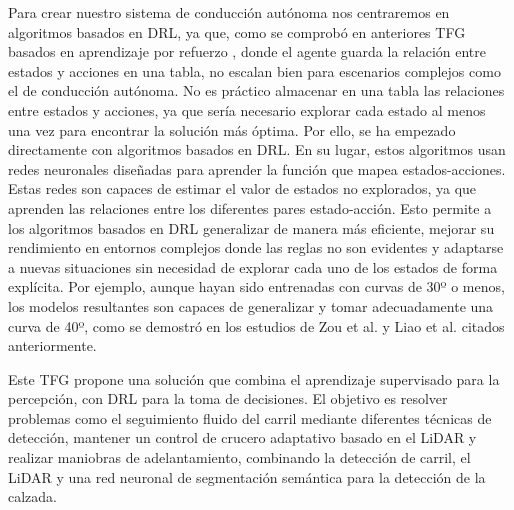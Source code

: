 Para crear nuestro sistema de conducción autónoma nos centraremos en algoritmos basados en \ac{DRL}, ya que, como se comprobó en anteriores \ac{TFG} basados en aprendizaje por refuerzo \cite{tfg-aws-carla}, donde el agente guarda la relación entre estados y acciones en una tabla, no escalan bien para escenarios complejos como el de conducción autónoma. No es práctico almacenar en una tabla las relaciones entre estados y acciones, ya que sería necesario explorar cada estado al menos una vez para encontrar la solución más óptima. Por ello, se ha empezado directamente con algoritmos basados en \ac{DRL}. En su lugar, estos algoritmos usan redes neuronales diseñadas para aprender la función que mapea estados-acciones. Estas redes son capaces de estimar el valor de estados no explorados, ya que aprenden las relaciones entre los diferentes pares estado-acción. Esto permite a los algoritmos basados en \ac{DRL} generalizar de manera más eficiente, mejorar su rendimiento en entornos complejos donde las reglas no son evidentes y adaptarse a nuevas situaciones sin necesidad de explorar cada uno de los estados de forma explícita. Por ejemplo, aunque hayan sido entrenadas con curvas de 30º o menos, los modelos resultantes son capaces de generalizar y tomar adecuadamente una curva de 40º, como se demostró en los estudios de Zou et al. \cite{sigue-carril} y Liao et al. \cite{adelantamiento} citados anteriormente.

Este \ac{TFG} propone una solución que combina el aprendizaje supervisado para la percepción, con \ac{DRL} para la toma de decisiones. El objetivo es resolver problemas como el seguimiento fluido del carril mediante diferentes técnicas de detección, mantener un control de crucero adaptativo basado en el \ac{LiDAR} y realizar maniobras de adelantamiento, combinando la detección de carril, el \ac{LiDAR} y una red neuronal de segmentación semántica para la detección de la calzada. 


